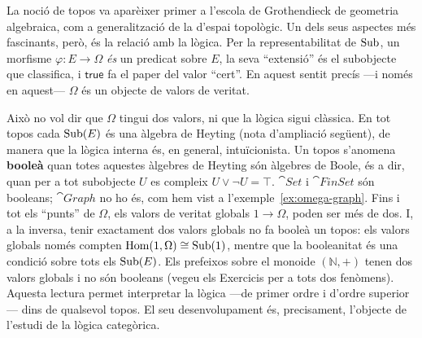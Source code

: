 \begin{observacio}\label{obs:omega-veritat}
La noció de topos va aparèixer primer a l'escola de Grothendieck de geometria algebraica, com a generalització de la d'espai topològic. Un dels seus aspectes més fascinants, però, és la relació amb la lògica. Per la representabilitat de $\operatorname{Sub}$, un morfisme $\varphi\colon E\to\Omega$ \emph{és} un predicat sobre $E$, la seva \enquote{extensió} és el subobjecte que classifica, i $\mathsf{true}$ fa el paper del valor \enquote{cert}. En aquest sentit precís ---i només en aquest--- $\Omega$ és un objecte de valors de veritat.

Això no vol dir que $\Omega$ tingui dos valors, ni que la lògica sigui clàssica. En tot topos cada $\operatorname{Sub}(E)$ és una àlgebra de Heyting (nota d'ampliació següent), de manera que la lògica interna és, en general, intuïcionista. Un topos s'anomena \textbf{booleà} quan totes aquestes àlgebres de Heyting són àlgebres de Boole, és a dir, quan per a tot subobjecte $U$ es compleix $U\vee\neg U=\top$. $\cat{Set}$ i $\cat{FinSet}$ són booleans; $\cat{Graph}$ no ho és, com hem vist a l'exemple~\ref{ex:omega-graph}. Fins i tot els \enquote{punts} de $\Omega$, els valors de veritat globals $1\to\Omega$, poden ser més de dos. I, a la inversa, tenir exactament dos valors globals no fa booleà un topos: els valors globals només compten $\operatorname{Hom}(1,\Omega)\cong\operatorname{Sub}(1)$, mentre que la booleanitat és una condició sobre tots els $\operatorname{Sub}(E)$. Els prefeixos sobre el monoide $(\mathbb N,+)$ tenen dos valors globals i no són booleans (vegeu els Exercicis per a tots dos fenòmens). Aquesta lectura permet interpretar la lògica ---de primer ordre i d'ordre superior--- dins de qualsevol topos. El seu desenvolupament és, precisament, l'objecte de l'estudi de la lògica categòrica.
\end{observacio}

